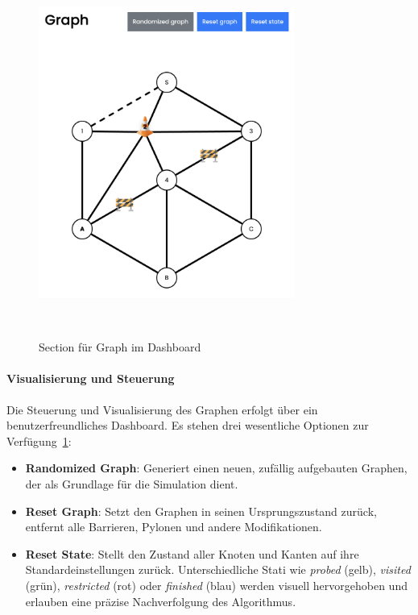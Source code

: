 \documentclass[main.tex]{subfiles} %
\begin{document}
\begin{figure}[H]
    \centering
    \includegraphics[width=0.75\textwidth]{./fig_Simulation/Graph.png}
    \caption{Section für Graph im Dashboard}~\label{fig:DashboardGraph}
\end{figure}

\paragraph{Visualisierung und Steuerung}

Die Steuerung und Visualisierung des Graphen erfolgt über ein benutzerfreundliches Dashboard. Es stehen drei wesentliche Optionen zur Verfügung~\ref{fig:DashboardGraph}:

\begin{itemize}
    \item \textbf{Randomized Graph}:  
    Generiert einen neuen, zufällig aufgebauten Graphen, der als Grundlage für die Simulation dient.

    \item \textbf{Reset Graph}:  
    Setzt den Graphen in seinen Ursprungszustand zurück, entfernt alle Barrieren, Pylonen und andere Modifikationen.

    \item \textbf{Reset State}:  
    Stellt den Zustand aller Knoten und Kanten auf ihre Standardeinstellungen zurück. Unterschiedliche Stati wie \emph{probed} (gelb), \emph{visited} (grün), \emph{restricted} (rot) oder \emph{finished} (blau) werden visuell hervorgehoben und erlauben eine präzise Nachverfolgung des Algorithmus.
\end{itemize}
\end{document}
